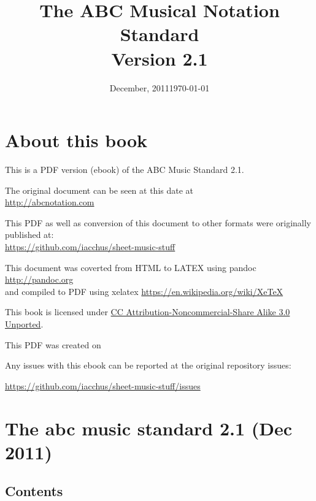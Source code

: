 \documentclass[oneside]{book}
\title{The ABC Musical Notation Standard\\\large Version 2.1}
\date{December, 2011}
\begin{document}
\maketitle

\section{About this book}

This is a PDF version (ebook) of the ABC Music Standard 2.1.

The original document can be seen at this date at \\\href{http://abcnotation.com}{http://abcnotation.com}

This PDF as well as conversion of this document to other formats were originally published at:\\
\href{https://github.com/iacchus/sheet-music-stuff}{https://github.com/iacchus/sheet-music-stuff}

This document was coverted from HTML to LATEX using pandoc \href{http://pandoc.org}{http://pandoc.org}\\
and compiled to PDF using xelatex \href{https://en.wikipedia.org/wiki/XeTeX}{https://en.wikipedia.org/wiki/XeTeX}

This book is licensed under \href{http://creativecommons.org/licenses/by-nc-sa/3.0/}{CC Attribution-Noncommercial-Share Alike 3.0 Unported}.
\vfill

This PDF was created on \date{\today}

Any issues with this ebook can be reported at the original repository issues:

\href{https://github.com/iacchus/sheet-music-stuff/issues}{https://github.com/iacchus/sheet-music-stuff/issues}

\pagebreak

\section{The abc music standard 2.1 (Dec
2011)}\label{the_abc_music_standard_21_dec_2011}

\subsection{Contents}\label{contents}
\end{document}
